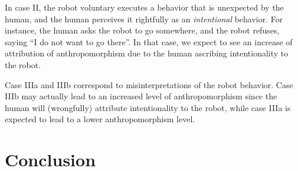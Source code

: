 \documentclass{frontiersSCNS} %
\begin{document}
In case II, the robot voluntary executes a behavior that is unexpected by the
human, and the human perceives it rightfully as an \emph{intentional} behavior.
For instance, the human asks the robot to go somewhere, and the robot refuses,
saying ``I do not want to go there''. In that case, we expect to see an increase
of attribution of anthropomorphism due to the human ascribing intentionality to
the robot.

Case IIIa and IIIb correspond to misinterpretations of the robot behavior. Case
IIIb may actually lead to an increased level of anthropomorphism since the human
will (wrongfully) attribute intentionality to the robot, while case IIIa is
expected to lead to a lower anthropomorphism level.

%
%
%
%
%
%

\section{Conclusion}
\label{sec:conclusion}
\end{document}
